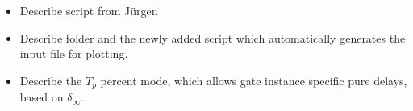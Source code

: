\begin{itemize}
	\item Describe  script from J\"urgen
	\item Describe  folder and the newly added script  which automatically generates the input file for plotting.
	\item Describe the $T_p$ percent mode, which allows gate instance specific pure delays, based on $\delta_\infty$.
\end{itemize}